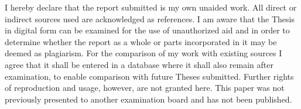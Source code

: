 \documentclass[12pt]{article}
\begin{document}
I hereby declare that the report submitted is my own unaided work. All direct or 
indirect sources used are acknowledged as references. I am aware that the Thesis 
in digital form can be examined for the use of unauthorized aid and in order to 
determine whether the report as a whole or parts incorporated in it may be 
deemed as plagiarism. For the comparison of my work with existing sources I 
agree that it shall be entered in a database where it shall also remain after 
examination, to enable comparison with future Theses submitted. Further rights 
of reproduction and usage, however, are not granted here. This paper was not 
previously presented to another examination board and has not been published. 

\end{document}
